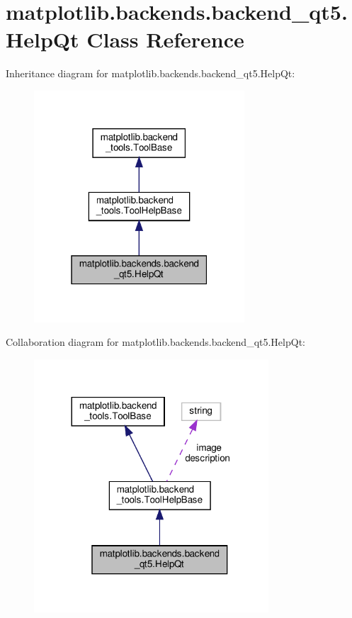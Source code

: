 \hypertarget{classmatplotlib_1_1backends_1_1backend__qt5_1_1HelpQt}{}\section{matplotlib.\+backends.\+backend\+\_\+qt5.\+Help\+Qt Class Reference}
\label{classmatplotlib_1_1backends_1_1backend__qt5_1_1HelpQt}


Inheritance diagram for matplotlib.\+backends.\+backend\+\_\+qt5.\+Help\+Qt\+:
\nopagebreak
\begin{figure}[H]
\begin{center}
\leavevmode
\includegraphics[width=223pt]{classmatplotlib_1_1backends_1_1backend__qt5_1_1HelpQt__inherit__graph}
\end{center}
\end{figure}


Collaboration diagram for matplotlib.\+backends.\+backend\+\_\+qt5.\+Help\+Qt\+:
\nopagebreak
\begin{figure}[H]
\begin{center}
\leavevmode
\includegraphics[width=248pt]{classmatplotlib_1_1backends_1_1backend__qt5_1_1HelpQt__coll__graph}
\end{center}
\end{figure}
